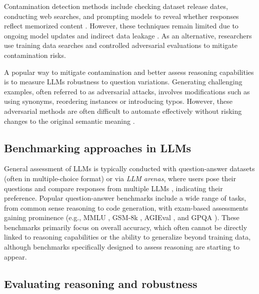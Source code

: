 Contamination detection methods include checking dataset release dates, conducting web searches, and prompting models to reveal whether responses reflect memorized content \citep{Jiang2024InvestigatingDC, dong2024generalizationmemorizationdatacontamination, golchin2024datacontaminationquiztool, sainz-etal-2023-nlp, yang2023rethinkingbenchmarkcontaminationlanguage, samuel2024datacontaminationdetectionmodern}. However, these techniques remain limited due to ongoing model updates and indirect data leakage \citep{ahuja_mega_2023, balloccu-etal-2024-leak}. As an alternative, researchers use training data searches and controlled adversarial evaluations to mitigate contamination risks.

A popular way to mitigate contamination and better assess reasoning capabilities is to measure LLMs robustness to question variations. Generating challenging examples, often referred to as adversarial attacks, involves modifications such as using synonyms, reordering instances or introducing typos. However, these adversarial methods are often difficult to automate effectively without risking changes to the original semantic meaning \citep{wang2022adversarialgluemultitaskbenchmark}.

\subsection{Benchmarking approaches in LLMs}

General assessment of LLMs is typically conducted with question-answer datasets (often in multiple-choice format) or via \textit{LLM arenas}, where users pose their questions and compare responses from multiple LLMs \citep{chiang_chatbot_2024}, indicating their preference. Popular question-answer benchmarks include a wide range of tasks, from common sense reasoning to code generation, with exam-based assessments gaining prominence (e.g., MMLU \citep{hendrycks_measuring_2021}, GSM-8k \citep{cobbe_training_2021}, AGIEval \citep{zhong_agieval_2023}, and GPQA \citep{rein_gpqa_2023}). These benchmarks primarily focus on overall accuracy, which often cannot be directly linked to reasoning capabilities or the ability to generalize beyond training data, although benchmarks specifically designed to assess reasoning are starting to appear.

\subsection{Evaluating reasoning and robustness}

